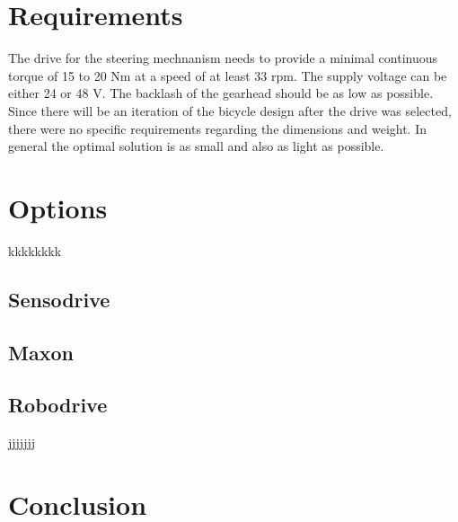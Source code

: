 \documentclass[a4paper]{article}
\title{\bf \maintitle\\
  \vspace{1cm}
  {\large
    \subtitle%
  }
}
\author{Nikolas Schroeder\\
  Institute for Systems Theory and Automatic Control\\
  \texttt{lrt86824@stud.uni-stuttgart.de}%
}
\date{\today}
\begin{document}
\maketitle

\hrulefill
\begin{abstract}
This report gives a short overview of the different drives and motor controllers that were considered for the bicycle's steering mechanism. 
\end{abstract}

\hrulefill

\pagebreak

\section{Requirements}

The drive for the steering mechnanism needs to provide a minimal continuous torque of 15 to 20 Nm at a speed of at least 33 rpm. The supply voltage can be either 24 or 48 V. The backlash of the gearhead should be as low as possible. Since there will be an iteration of the bicycle design after the drive was selected, there were no specific requirements regarding the dimensions and weight. In general the optimal solution is as small and also as light as possible.  

{\small


}


\section{Options}

kkkkkkkk
\subsection{Sensodrive}

\subsection{Maxon}

\subsection{Robodrive}

jjjjjjj

{\small


}


\section{Conclusion}

{\small


}
\end{document}
